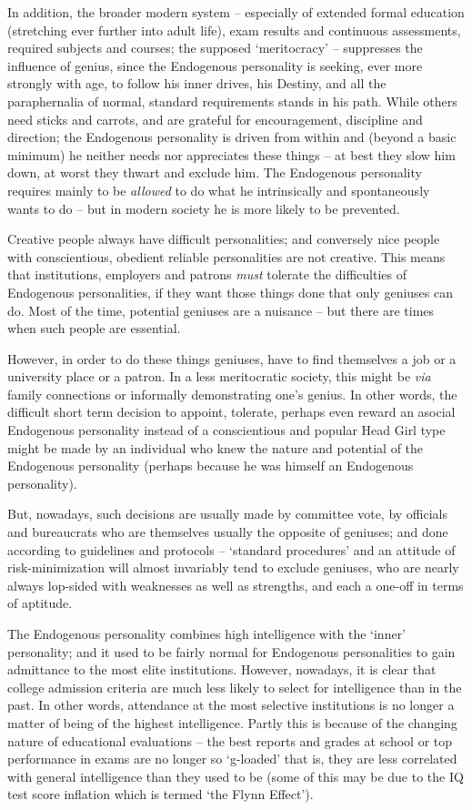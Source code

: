 \documentclass[
]{book}
\begin{document}
In addition, the broader modern system -- especially of extended formal education (stretching ever further into adult life), exam results and continuous assessments, required subjects and courses; the supposed `meritocracy' -- suppresses the influence of genius, since the Endogenous personality is seeking, ever more strongly with age, to follow his inner drives, his Destiny, and all the paraphernalia of normal, standard requirements stands in his path. While others need sticks and carrots, and are grateful for encouragement, discipline and direction; the Endogenous personality is driven from within and (beyond a basic minimum) he neither needs nor appreciates these things -- at best they slow him down, at worst they thwart and exclude him. The Endogenous personality requires mainly to be \emph{allowed} to do what he intrinsically and spontaneously wants to do -- but in modern society he is more likely to be prevented.

Creative people always have difficult personalities; and conversely nice people with conscientious, obedient reliable personalities are not creative. This means that institutions, employers and patrons \emph{must} tolerate the difficulties of Endogenous personalities, if they want those things done that only geniuses can do. Most of the time, potential geniuses are a nuisance -- but there are times when such people are essential.

However, in order to do these things geniuses, have to find themselves a job or a university place or a patron. In a less meritocratic society, this might be \emph{via} family connections or informally demonstrating one's genius. In other words, the difficult short term decision to appoint, tolerate, perhaps even reward an asocial Endogenous personality instead of a conscientious and popular Head Girl type might be made by an individual who knew the nature and potential of the Endogenous personality (perhaps because he was himself an Endogenous personality).

But, nowadays, such decisions are usually made by committee vote, by officials and bureaucrats who are themselves usually the opposite of geniuses; and done according to guidelines and protocols -- `standard procedures' and an attitude of risk-minimization will almost invariably tend to exclude geniuses, who are nearly always lop-sided with weaknesses as well as strengths, and each a one-off in terms of aptitude.

The Endogenous personality combines high intelligence with the `inner' personality; and it used to be fairly normal for Endogenous personalities to gain admittance to the most elite institutions. However, nowadays, it is clear that college admission criteria are much less likely to select for intelligence than in the past. In other words, attendance at the most selective institutions is no longer a matter of being of the highest intelligence. Partly this is because of the changing nature of educational evaluations -- the best reports and grades at school or top performance in exams are no longer so `g-loaded' that is, they are less correlated with general intelligence than they used to be (some of this may be due to the IQ test score inflation which is termed `the Flynn Effect').
\end{document}
